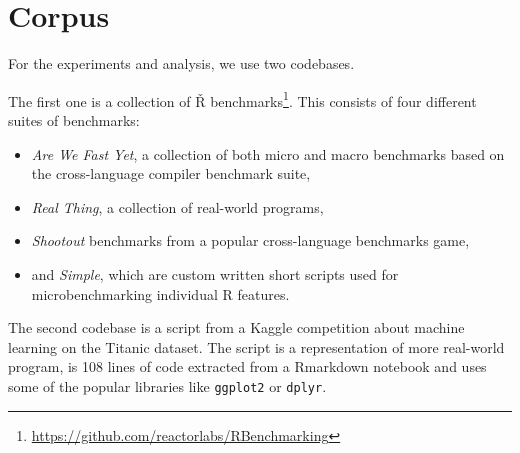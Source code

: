 \section{Corpus}\label{ch:1-corpus}

For the experiments and analysis, we use two codebases.

The first one is a collection of Ř benchmarks\footnote{\url{https://github.com/reactorlabs/RBenchmarking}}. This consists of four different suites of benchmarks:
\begin{itemize}
	\item{} \textit{Are We Fast Yet}, a collection of both micro and macro benchmarks based on the cross-language compiler benchmark suite\cite{are-we-fast-yet},
	\item{} \textit{Real Thing}, a collection of real-world programs,
	\item{} \textit{Shootout} benchmarks from a popular cross-language benchmarks game\cite{shootout},
	\item{} and \textit{Simple}, which are custom written short scripts used for microbenchmarking individual R features.
\end{itemize}

The second codebase is a script from a Kaggle competition about machine learning on the Titanic dataset\cite{titanic}. The script is a representation of more real-world program, is 108 lines of code extracted from a Rmarkdown notebook and uses some of the popular libraries like \texttt{ggplot2} or \texttt{dplyr}.


